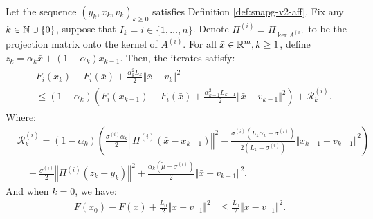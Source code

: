 \documentclass[12pt]{article}
\begin{document}
    \begin{lemma}\;\label{lemma:snagp2-one-step-s1}\\
        Let the sequence $(y_k, x_k, v_k)_{k \ge 0}$ satisfies Definition \ref{def:snapg-v2-aff}. 
        Fix any $k \in \mathbb N \cup\{0\}$, suppose that $I_k = i \in \{1, \ldots, n\}$.
        Denote $\Pi^{(i)} = \Pi_{\ker A^{(i)}}$ to be the projection matrix onto the kernel of $A^{(i)}$. 
        For all $\bar x \in \mathbb R^m, k \ge 1$, define $z_k = \alpha_k \bar x + (1 - \alpha_k)x_{k - 1}$. 
        Then, the iterates satisfy: 
        \begin{align}\label{ineq:snagp2-one-step-s1-rslt1}
            \begin{split}
                & F_i(x_k) - F_i(\bar x)
                + \frac{\alpha_k^2L_k}{2}\Vert \bar x - v_k\Vert^2
                \\&\le 
                (1 - \alpha_k)\left(
                    F_i(x_{k - 1}) - F_i(\bar x) + \frac{\alpha_{k - 1}^2L_{k - 1}}{2} \Vert \bar x - v_{k - 1}\Vert^2
                \right) + \mathcal R_k^{(i)}. 
            \end{split}
        \end{align}
        Where: 
        \begin{align*}
            & \mathcal R_k^{(i)} = (1 - \alpha_k)\left(
                \frac{\sigma^{(i)}\alpha_k}{2}\left\Vert \Pi^{(i)} (\bar x - x_{k - 1})\right\Vert^2
                - \frac{\sigma^{(i)}\left(L_k\alpha_k - \sigma^{(i)}\right)}{2\left(L_k - \sigma^{(i)}\right)}\Vert x_{k - 1} - v_{k - 1} \Vert^2
            \right)
                \\&\quad
                + \frac{\sigma^{(i)}}{2}\left\Vert \Pi^{(i)}(z_k - y_k)\right\Vert^2
                + \frac{\alpha_k(\tilde\mu - \sigma^{(i)})}{2} \Vert \bar x - v_{k - 1}\Vert^2. 
        \end{align*}
        And when $k = 0$, we have: 
        \begin{align}\label{ineq:snagp2-one-step-s1-rslt2}
            F(x_0) - F(\bar x) + \frac{L_0}{2}\Vert \bar x - v_{-1}\Vert^2 
            &\le \frac{L_0}{2}\Vert \bar x - v_{-1}\Vert^2. 
        \end{align}
    \end{lemma}
\end{document}
